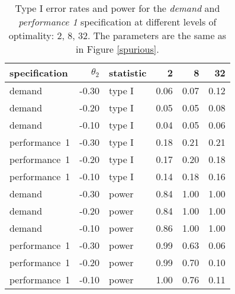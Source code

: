 \begin{table}[ht]
\centering
\begingroup\footnotesize
\begin{tabular}{lrlrrr}
  \hline
specification & $\theta_2$ & statistic & 2 & 8 & 32 \\ 
  \hline
demand & -0.30 & type I & 0.06 & 0.07 & 0.12 \\ 
  demand & -0.20 & type I & 0.05 & 0.05 & 0.08 \\ 
  demand & -0.10 & type I & 0.04 & 0.05 & 0.06 \\ 
  performance~1 & -0.30 & type I & 0.18 & 0.21 & 0.21 \\ 
  performance~1 & -0.20 & type I & 0.17 & 0.20 & 0.18 \\ 
  performance~1 & -0.10 & type I & 0.14 & 0.18 & 0.16 \\ 
  demand & -0.30 & power & 0.84 & 1.00 & 1.00 \\ 
  demand & -0.20 & power & 0.84 & 1.00 & 1.00 \\ 
  demand & -0.10 & power & 0.86 & 1.00 & 1.00 \\ 
  performance~1 & -0.30 & power & 0.99 & 0.63 & 0.06 \\ 
  performance~1 & -0.20 & power & 0.99 & 0.70 & 0.10 \\ 
  performance~1 & -0.10 & power & 1.00 & 0.76 & 0.11 \\ 
   \hline
\end{tabular}
\endgroup
\caption{Type I error rates and power for the \emph{demand} and
             \emph{performance 1} specification at different levels of 
             optimality: 2, 8, 32. The parameters are the same as in Figure 
             \ref{spurious}.} 
\label{spurious-table}
\end{table}
